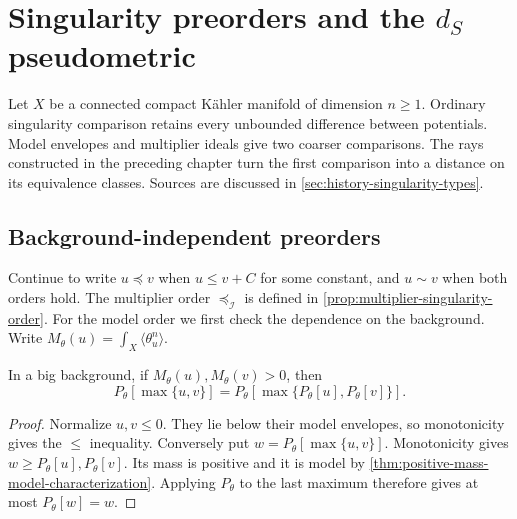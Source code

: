 \chapter{Singularity preorders and the \texorpdfstring{$d_S$}{dS} pseudometric}
\label{chap:q12}
Let $X$ be a connected compact K\"ahler manifold of dimension $n\geq1$. Ordinary singularity comparison retains every unbounded difference between potentials. Model envelopes and multiplier ideals give two coarser comparisons. The rays constructed in the preceding chapter turn the first comparison into a distance on its equivalence classes. Sources are discussed in \cref{sec:history-singularity-types}.

\section{Background-independent preorders}
\label{sec:singularity-preorders}
Continue to write $u\preceq v$ when $u\leq v+C$ for some constant, and $u\sim v$ when both orders hold. The multiplier order $\preceq_{\mathcal I}$ is defined in \cref{prop:multiplier-singularity-order}. For the model order we first check the dependence on the background. Write $M_\theta(u)=\int_X\langle\theta_u^n\rangle$.

\begin{lemma}\label{lem:p-envelope-maximum-identity}
In a big background, if $M_\theta(u),M_\theta(v)>0$, then
\[
 P_\theta[\max\{u,v\}]
      =P_\theta[\max\{P_\theta[u],P_\theta[v]\}].
\]
\end{lemma}
\begin{proof}
Normalize $u,v\leq0$. They lie below their model envelopes, so monotonicity gives the $\leq$ inequality. Conversely put $w=P_\theta[\max\{u,v\}]$. Monotonicity gives $w\geq P_\theta[u],P_\theta[v]$. Its mass is positive and it is model by \cref{thm:positive-mass-model-characterization}. Applying $P_\theta$ to the last maximum therefore gives at most $P_\theta[w]=w$.
\end{proof}

